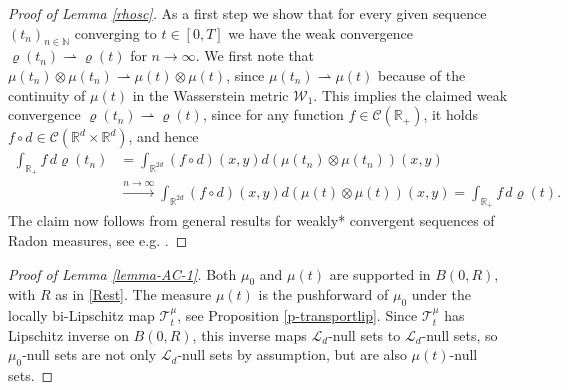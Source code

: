 \documentclass[A4paper,11pt]{article}
\theoremstyle{definition}
\newcommand{\N}{\mathbb{N}}
\newcommand{\R}{\mathbb{R}}
\newcommand{\cl}{\mathcal{L}}
\newcommand{\ct}{\mathcal{T}}
\newcommand{\W}{\mathcal{W}}
\begin{document}
\begin{proof}[Proof of Lemma \ref{rhosc}] As a first step we show that for every given sequence $(t_n)_{n \in \N}$ converging to $t\in [0,T]$ we have the weak
	convergence $\varrho(t_n)\rightharpoonup\varrho(t)$ for $n \rightarrow \infty$. 
	We first note that $\mu(t_n)\otimes\mu(t_n)\rightharpoonup\mu(t)\otimes\mu(t)$, since $\mu(t_n)\rightharpoonup\mu(t)$ because of the continuity of $\mu(t)$ in the Wasserstein metric $\W_1$.	
%	
	This implies the claimed weak convergence $\varrho(t_n)\rightharpoonup\varrho(t)$, since for any
	function $f\in \mathcal{C}(\R_+)$, it holds $f\circ d\in\mathcal{C}(\R^d\times\R^d)$, and hence
	\begin{align*}
		\int_{\R_+}f\,d\varrho(t_n)
			&=\int_{\R^{2d}}(f\circ d)(x,y)d(\mu(t_n)\otimes\mu(t_n))(x,y)\\
			&\stackrel{n\rightarrow\infty}{\longrightarrow}
				\int_{\R^{2d}}(f\circ d)(x,y)d(\mu(t)\otimes\mu(t))(x,y)
			=\int_{\R_+}f\,d\varrho(t).
	\end{align*}
	The claim now follows from general results for weakly* convergent sequences of Radon measures, see e.g. \cite[Proposition 1.62]{AFP00}.
\end{proof}



\begin{proof}[Proof of Lemma \ref{lemma-AC-1}]
Both $\mu_0$ and $\mu(t)$ are supported in $B(0,R)$, with $R$ as in \eqref{Rest}. The measure $\mu(t)$ is the pushforward of $\mu_0$ under the locally bi-Lipschitz map $\ct^\mu_t$, see Proposition \ref{p-transportlip}. Since $\ct^\mu_t$ has Lipschitz inverse on $B(0,R)$, this inverse maps $\cl_d$-null sets to $\cl_d$-null sets, so $\mu_0$-null sets are not only $\cl_d$-null sets by assumption, but are also $\mu(t)$-null sets.
\end{proof}
\end{document}

